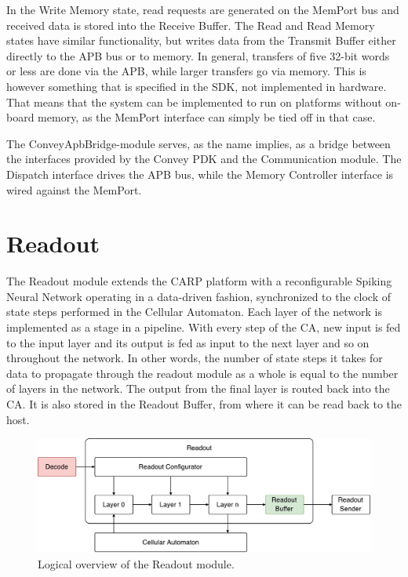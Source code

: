 In the Write Memory state, read requests are generated on the MemPort bus and
received data is stored into the Receive Buffer. The Read and Read Memory states
have similar functionality, but writes data from the Transmit Buffer either
directly to the APB bus or to memory. In general, transfers of five 32-bit words
or less are done via the APB, while larger transfers go via memory. This is
however something that is specified in the SDK, not implemented in hardware.
That means that the system can be implemented to run on platforms without
on-board memory, as the MemPort interface can simply be tied off in that case.

The ConveyApbBridge-module serves, as the name implies, as a bridge between the
interfaces provided by the Convey PDK and the Communication module. The Dispatch
interface drives the APB bus, while the Memory Controller interface is wired
against the MemPort.

\section{Readout}
\label{sec:readout}

The Readout module extends the CARP platform with a reconfigurable Spiking
Neural Network operating in a data-driven fashion, synchronized to the clock of
state steps performed in the Cellular Automaton. Each layer of the network is
implemented as a stage in a pipeline. With every step of the CA, new input is
fed to the input layer and its output is fed as input to the next layer and so
on throughout the network. In other words, the number of state steps it takes
for data to propagate through the readout module as a whole is equal to the
number of layers in the network. The output from the final layer is routed back
into the CA. It is also stored in the Readout Buffer, from where it can be read
back to the host.

\begin{figure}[ht]
  \centering
  \includegraphics[width=\linewidth]{fig/readout-io}
  \caption{Logical overview of the Readout module.}
  \label{fig:readout-io}
\end{figure}

